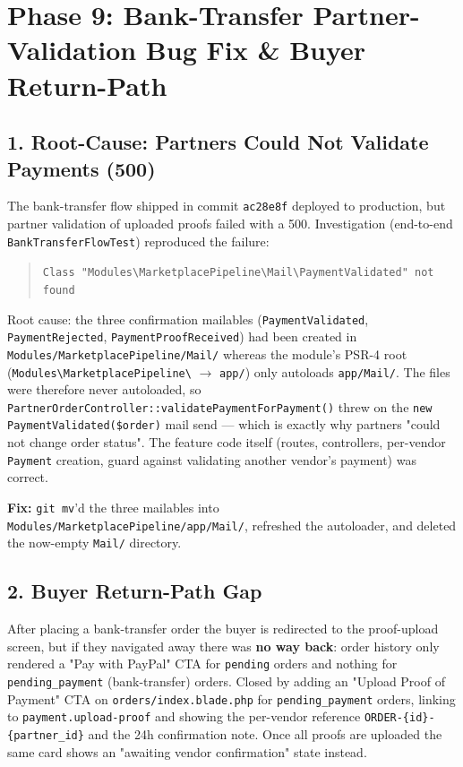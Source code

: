 \documentclass[12pt,a4paper]{article}
\begin{document}
\section{Phase 9: Bank-Transfer Partner-Validation Bug Fix \& Buyer Return-Path}

\subsection{1. Root-Cause: Partners Could Not Validate Payments (500)}

The bank-transfer flow shipped in commit \texttt{ac28e8f} deployed to production, but partner
validation of uploaded proofs failed with a 500. Investigation (end-to-end \texttt{BankTransferFlowTest})
reproduced the failure:

\begin{quote}
    \texttt{Class "Modules\textbackslash MarketplacePipeline\textbackslash Mail\textbackslash PaymentValidated" not found}
\end{quote}

Root cause: the three confirmation mailables (\texttt{PaymentValidated}, \texttt{PaymentRejected},
\texttt{PaymentProofReceived}) had been created in \texttt{Modules/MarketplacePipeline/Mail/}
whereas the module's PSR-4 root (\texttt{Modules\textbackslash MarketplacePipeline\textbackslash} $\rightarrow$
\texttt{app/}) only autoloads \texttt{app/Mail/}. The files were therefore never autoloaded, so
\texttt{PartnerOrderController::validatePaymentForPayment()} threw on the \texttt{new PaymentValidated(\$order)}
mail send — which is exactly why partners "could not change order status". The feature code itself
(routes, controllers, per-vendor \texttt{Payment} creation, guard against validating another vendor's
payment) was correct.

\textbf{Fix:} \texttt{git mv}'d the three mailables into \texttt{Modules/MarketplacePipeline/app/Mail/},
refreshed the autoloader, and deleted the now-empty \texttt{Mail/} directory.

\subsection{2. Buyer Return-Path Gap}

After placing a bank-transfer order the buyer is redirected to the proof-upload screen, but if they
navigated away there was \textbf{no way back}: order history only rendered a "Pay with PayPal" CTA for
\texttt{pending} orders and nothing for \texttt{pending\_payment} (bank-transfer) orders. Closed by adding
an "Upload Proof of Payment" CTA on \texttt{orders/index.blade.php} for \texttt{pending\_payment} orders,
linking to \texttt{payment.upload-proof} and showing the per-vendor reference \texttt{ORDER-\{id\}-\{partner\_id\}}
and the 24h confirmation note. Once all proofs are uploaded the same card shows an "awaiting vendor
confirmation" state instead.
\end{document}
